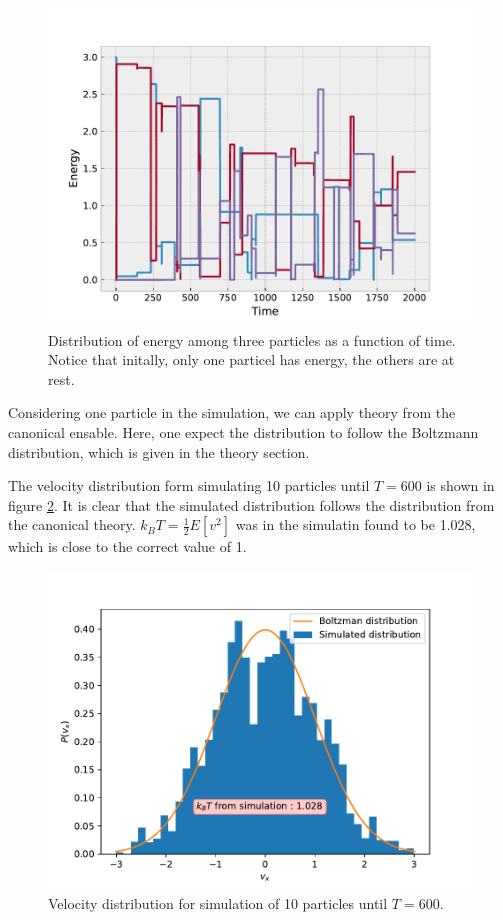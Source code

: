 \documentclass[a4paper,12pt]{article}
\begin{document}
\begin{figure}[htp]
  \centering
  \includegraphics[width=.75\textwidth]{media/energy_dispersion}
  \caption{Distribution of energy among three particles as a function of time. Notice that initally, only one particel has energy, the others are at rest.\label{fig:energy_dispersion}}
\end{figure}


Considering one particle in the simulation, we can apply theory from the canonical ensable.
Here, one expect the distribution to follow the Boltzmann distribution, which is given in the theory section.

The velocity distribution form simulating 10 particles until $T=600$ is shown in figure \ref{fig:velocity_distribution}.
It is clear that the simulated distribution follows the distribution from the canonical theory.
$k_B T = \frac12 E[v^2]$ was in the simulatin found to be 1.028, which is close to the correct value of 1.

\begin{figure}[htp]
  \centering
  \includegraphics[width=.75\textwidth]{media/velocity_distribution}
  \caption{Velocity distribution for simulation of 10 particles until $T=600$.\label{fig:velocity_distribution}}
\end{figure}
\end{document}
